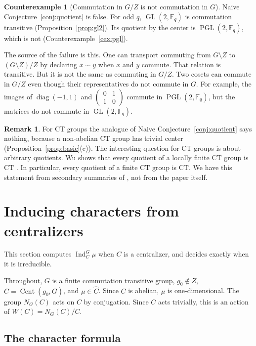 \documentclass[12pt,letterpaper]{article}
\numberwithin{equation}{section}
\theoremstyle{plain}
\theoremstyle{definition}
\newtheorem{counterexample}[theorem]{Counterexample}
\newtheorem{yremark}{Remark}
\newcommand{\F}{\mathbb{F}}
\DeclareMathOperator{\Cent}{Cent}
\DeclareMathOperator{\Ind}{Ind}
\DeclareMathOperator{\GL}{GL}
\DeclareMathOperator{\PGL}{PGL}
\DeclareMathOperator{\diag}{diag}
\begin{document}
\begin{counterexample}[Commutation in $G/Z$ is not commutation in $G$]
\label{cex:quotient}
Naive Conjecture~\ref{conj:quotient} is false. For odd $q$, $\GL(2,\F_q)$
is commutation transitive (Proposition~\ref{prop:gl2}). Its quotient by the
center is $\PGL(2,\F_q)$, which is not (Counterexample~\ref{cex:pgl}).

The source of the failure is this. One can transport commuting from
$G\setminus Z$ to $(G\setminus Z)/Z$ by declaring $\bar x\sim\bar y$ when $x$
and $y$ commute. That relation is transitive. But it is not the same as
commuting in $G/Z$. Two cosets can commute in $G/Z$ even though their
representatives do not commute in $G$. For example, the images of
$\diag(-1,1)$ and $\left(\begin{smallmatrix}0&1\\1&0\end{smallmatrix}
\right)$ commute in $\PGL(2,\F_q)$, but the matrices do not commute in
$\GL(2,\F_q)$.
\end{counterexample}

\begin{yremark}\label{rem:wu}
For CT groups the analogue of Naive Conjecture~\ref{conj:quotient} says
nothing, because a non-abelian CT group has trivial center
(Proposition~\ref{prop:basic}(c)). The interesting question for CT groups
is about arbitrary quotients. Wu shows that every quotient of a locally
finite CT group is CT \cite{Wu98}. In particular, every quotient of a finite
CT group is CT. We have this statement from secondary summaries of
\cite{Wu98}, not from the paper itself.
\end{yremark}

\section{Inducing characters from centralizers}\label{sec:induced}

This section computes $\Ind_C^G\mu$ when $C$ is a centralizer, and decides
exactly when it is irreducible.

Throughout, $G$ is a finite commutation transitive group, $g_0\notin Z$,
$C=\Cent(g_0,G)$, and $\mu\in\widehat C$. Since $C$ is abelian, $\mu$ is
one-dimensional. The group $N_G(C)$ acts on $C$ by conjugation. Since $C$
acts trivially, this is an action of $W(C)=N_G(C)/C$.

\subsection{The character formula}
\end{document}

